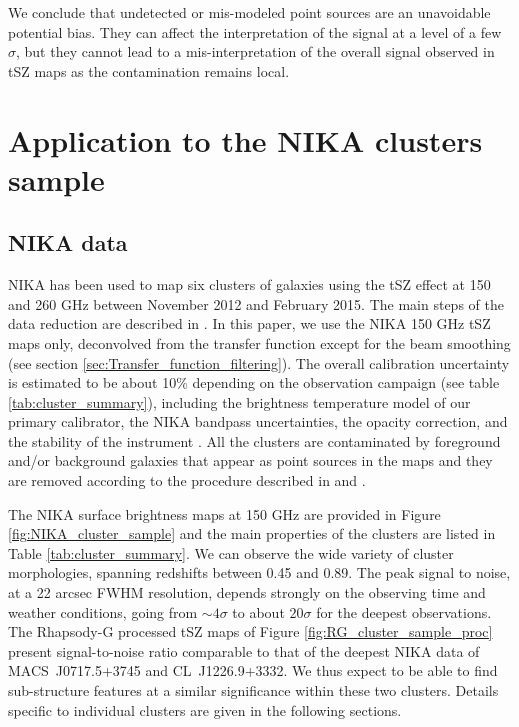 \documentclass[twocolumn,traditabstract]{aa}
\begin{document}
We conclude that undetected or mis-modeled point sources are an unavoidable potential bias. They can affect the interpretation of the signal at a level of a few $\sigma$, but they cannot lead to a mis-interpretation of the overall signal observed in tSZ maps as the contamination remains local.

\section{Application to the NIKA clusters sample}\label{sec:Application_to_the_NIKA_clusters_sample}
\subsection{NIKA data}\label{sec:NIKA_Data}
NIKA has been used to map six clusters of galaxies using the tSZ effect at 150 and 260 GHz between November 2012 and February 2015. The main steps of the data reduction are described in \cite{Adam2014,Adam2015}. In this paper, we use the NIKA 150 GHz tSZ maps only, deconvolved from the transfer function except for the beam smoothing (see section \ref{sec:Transfer_function_filtering}). The overall calibration uncertainty is estimated to be about 10\% depending on the observation campaign (see table \ref{tab:cluster_summary}), including the brightness temperature model of our primary calibrator, the NIKA bandpass uncertainties, the opacity correction, and the stability of the instrument \citep{Catalano2014}. All the clusters are contaminated by foreground and/or background galaxies that appear as point sources in the maps and they are removed according to the procedure described in \cite{Adam2015} and \cite{Adam2016a}. 

The NIKA surface brightness maps at 150 GHz are provided in Figure \ref{fig:NIKA_cluster_sample} and the main properties of the clusters are listed in Table \ref{tab:cluster_summary}. We can observe the wide variety of cluster morphologies, spanning redshifts between 0.45 and 0.89. The peak signal to noise, at a 22 arcsec FWHM resolution, depends strongly on the observing time and weather conditions, going from $\sim 4 \sigma$ to about $20 \sigma$ for the deepest observations. The Rhapsody-G processed tSZ maps of Figure \ref{fig:RG_cluster_sample_proc} present signal-to-noise ratio comparable to that of the deepest NIKA data of \mbox{MACS~J0717.5+3745} and \mbox{CL~J1226.9+3332}. We thus expect to be able to find sub-structure features at a similar significance within these two clusters. Details specific to individual clusters are given in the following sections.
\end{document}

